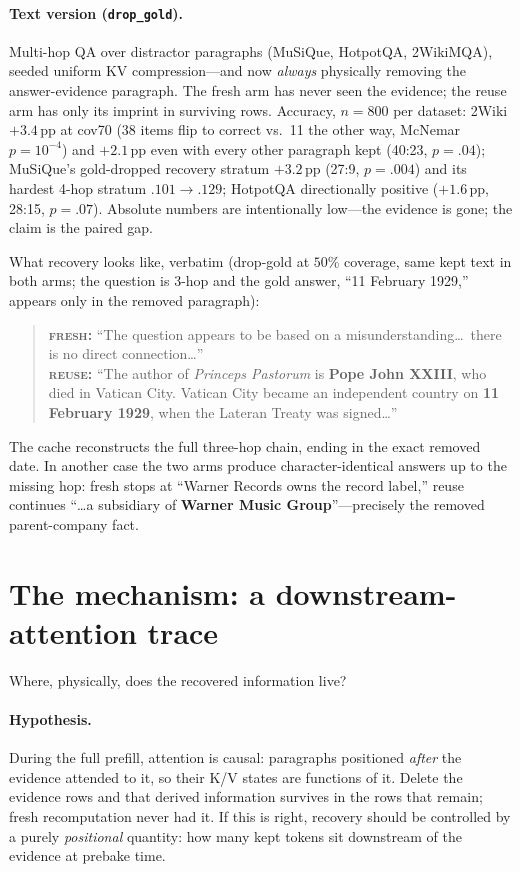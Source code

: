 \documentclass[11pt]{article}
\newcommand{\pp}{\,\mathrm{pp}}
\newcommand{\fresh}{\textsc{fresh}}
\newcommand{\reuse}{\textsc{reuse}}
\begin{document}
\paragraph{Text version (\texttt{drop\_gold}).}
Multi-hop QA over distractor paragraphs (MuSiQue, HotpotQA, 2WikiMQA), seeded uniform KV compression---and now \emph{always} physically removing the answer-evidence paragraph. The fresh arm has never seen the evidence; the reuse arm has only its imprint in surviving rows. Accuracy, $n=800$ per dataset: 2Wiki $+3.4\pp$ at cov70 (38 items flip to correct vs.\ 11 the other way, McNemar $p{=}10^{-4}$) and $+2.1\pp$ even with every other paragraph kept (40:23, $p{=}.04$); MuSiQue's gold-dropped recovery stratum $+3.2\pp$ (27:9, $p{=}.004$) and its hardest 4-hop stratum $.101\rightarrow.129$; HotpotQA directionally positive ($+1.6\pp$, 28:15, $p{=}.07$). Absolute numbers are intentionally low---the evidence is gone; the claim is the paired gap.

What recovery looks like, verbatim (drop-gold at $50\%$ coverage, same kept text in both arms; the question is 3-hop and the gold answer, ``11 February 1929,'' appears only in the removed paragraph):

\begin{quote}\small
\textbf{\fresh{}:} ``The question appears to be based on a misunderstanding\ldots\ there is no direct connection\ldots''\\[2pt]
\textbf{\reuse{}:} ``The author of \emph{Princeps Pastorum} is \textbf{Pope John XXIII}, who died in Vatican City. Vatican City became an independent country on \textbf{11 February 1929}, when the Lateran Treaty was signed\ldots''
\end{quote}

The cache reconstructs the full three-hop chain, ending in the exact removed date. In another case the two arms produce character-identical answers up to the missing hop: fresh stops at ``Warner Records owns the record label,'' reuse continues ``\ldots a subsidiary of \textbf{Warner Music Group}''---precisely the removed parent-company fact.

\section{The mechanism: a downstream-attention trace}
\label{sec:mechanism}

Where, physically, does the recovered information live?

\paragraph{Hypothesis.}
During the full prefill, attention is causal: paragraphs positioned \emph{after} the evidence attended to it, so their K/V states are functions of it. Delete the evidence rows and that derived information survives in the rows that remain; fresh recomputation never had it. If this is right, recovery should be controlled by a purely \emph{positional} quantity: how many kept tokens sit downstream of the evidence at prebake time.
\end{document}
